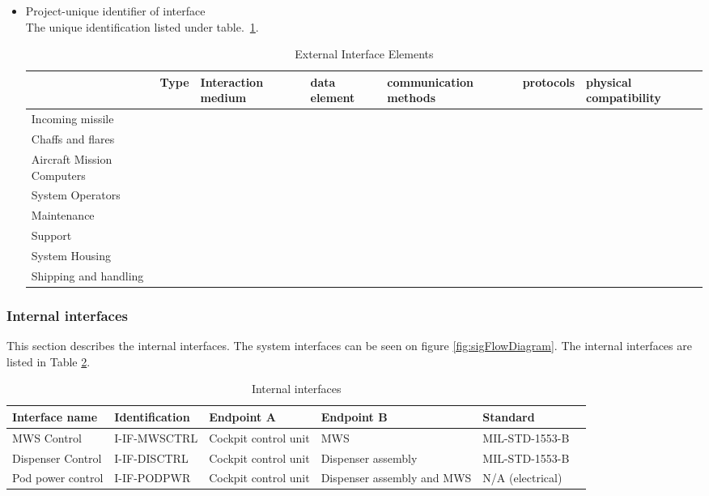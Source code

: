 \begin{itemize}
\item {Project-unique identifier of interface}\\
The unique identification listed under table.~\ref{tab:External2}. 
\begin{table}
\caption{External Interface Elements}
\label{tab:External2}
\begin{tabular}{ l l l l l l l }
\hline
&Type&Interaction medium&data element&communication methods&protocols&physical compatibility\\
\hline
Incoming missile&&&&&&\\
\hline
Chaffs and flares&&&&&&\\
\hline
Aircraft Mission Computers&&&&&&\\
\hline
System Operators&&&&&&\\
\hline
Maintenance&&&&&&\\
\hline
Support&&&&&&\\
\hline
System Housing&&&&&&\\
\hline
Shipping and handling&&&&&&\\
\hline
\end{tabular}
\end{table}
\end{itemize}


\clearpage
\subsubsection{Internal interfaces}
This section describes the internal interfaces. The system interfaces can be seen on figure \ref{fig:sigFlowDiagram}. The internal interfaces are listed in Table \ref{tab:internal}.

\begin{center}
\begin{table}[h]
\caption{Internal interfaces}
\label{tab:internal}
\begin{tabular}{ | p{2cm} | l | p{2.3cm} | p{2.3cm} | l | p{1cm} |}
\hline
 \textbf{Interface name} & \textbf{Identification} & \textbf{Endpoint A} & \textbf{Endpoint B} & \textbf{Standard}\\ \hline
 MWS Control & I-IF-MWSCTRL & Cockpit control unit & MWS & MIL-STD-1553-B\\ \hline
 Dispenser Control & I-IF-DISCTRL & Cockpit control unit & Dispenser assembly & MIL-STD-1553-B\\ \hline
 Pod power control & I-IF-PODPWR & Cockpit control unit & Dispenser assembly and MWS & N/A (electrical)\\ \hline
\end{tabular}
\end{table}
\end{center}

